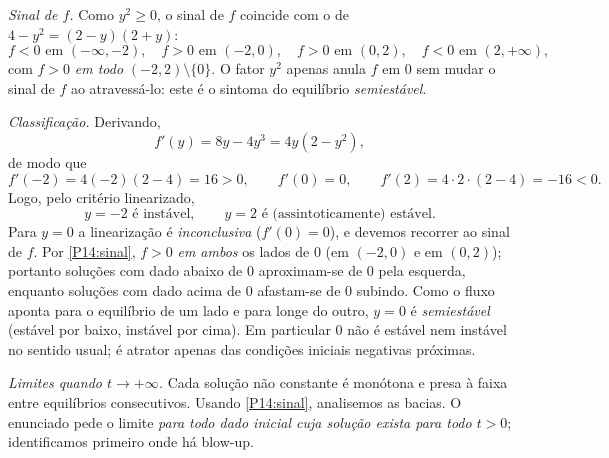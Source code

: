 \medskip\noindent\emph{Sinal de $f$.}
Como $y^2\ge0$, o sinal de $f$ coincide com o de $4-y^2=(2-y)(2+y)$:
\begin{equation}\label{P14:sinal}
f<0 \text{ em } (-\infty,-2),\quad f>0 \text{ em } (-2,0),\quad f>0 \text{ em } (0,2),\quad f<0 \text{ em } (2,+\infty),
\end{equation}
com $f>0$ \emph{em todo} $(-2,2)\setminus\{0\}$. O fator $y^2$ apenas anula $f$ em $0$ sem mudar o sinal de $f$ ao atravessá-lo: este é o sintoma do equilíbrio \emph{semiestável}.

\medskip\noindent\emph{Classificação.}
Derivando,
\[
f'(y)=8y-4y^3=4y(2-y^2) ,
\]
de modo que
\[
f'(-2)=4(-2)(2-4)=16>0,\qquad f'(0)=0,\qquad f'(2)=4\cdot2\cdot(2-4)=-16<0 .
\]
Logo, pelo critério linearizado,
\[
y=-2 \text{ é instável},\qquad y=2 \text{ é (assintoticamente) estável}.
\]
Para $y=0$ a linearização é \emph{inconclusiva} ($f'(0)=0$), e devemos recorrer ao sinal de $f$. Por \eqref{P14:sinal}, $f>0$ \emph{em ambos} os lados de $0$ (em $(-2,0)$ e em $(0,2)$); portanto soluções com dado abaixo de $0$ aproximam-se de $0$ pela esquerda, enquanto soluções com dado acima de $0$ afastam-se de $0$ subindo. Como o fluxo aponta para o equilíbrio de um lado e para longe do outro, $y=0$ é \emph{semiestável} (estável por baixo, instável por cima). Em particular $0$ não é estável nem instável no sentido usual; é atrator apenas das condições iniciais negativas próximas.

\medskip\noindent\emph{Limites quando $t\to+\infty$.}
Cada solução não constante é monótona e presa à faixa entre equilíbrios consecutivos. Usando \eqref{P14:sinal}, analisemos as bacias. O enunciado pede o limite \emph{para todo dado inicial cuja solução exista para todo $t>0$}; identificamos primeiro onde há blow-up.

